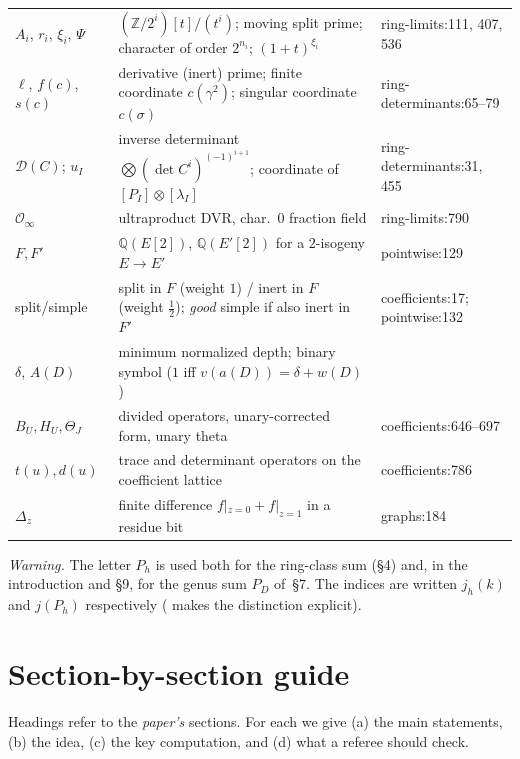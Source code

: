 \documentclass[11pt]{article}
\theoremstyle{remark}
\newcommand{\Q}{\mathbb Q}
\newcommand{\Z}{\mathbb Z}
\newcommand{\cO}{\mathcal O}
\newcommand{\cD}{\mathcal D}
\newcommand{\src}[2]{\textsf{\small #1:#2}}
\begin{document}
{\begin{longtable}{@{}P{0.19\textwidth}P{0.55\textwidth}P{0.2\textwidth}@{}}
$A_i$, $r_i$, $\xi_i$, $\Psi$ & $(\Z/2^i)[t]/(t^i)$; moving split prime; character of order $2^{n_i}$; $(1+t)^{\xi_i}$ & \src{ring-limits}{111, 407, 536} \\
$\ell$, $f(c)$, $s(c)$ & derivative (inert) prime; finite coordinate $c(\gamma^2)$; singular coordinate $c(\sigma)$ & \src{ring-determinants}{65--79} \\
$\cD(C)$; $u_I$ & inverse determinant $\bigotimes(\det C^i)^{(-1)^{i+1}}$; coordinate of $[P_I]\otimes[\lambda_I]$ & \src{ring-determinants}{31, 455} \\
$\cO_\infty$ & ultraproduct DVR, char.\ $0$ fraction field & \src{ring-limits}{790} \\
$F,F'$ & $\Q(E[2])$, $\Q(E'[2])$ for a $2$-isogeny $E\to E'$ & \src{pointwise}{129} \\
split/simple & split in $F$ (weight $1$) / inert in $F$ (weight $\frac12$); \emph{good} simple if also inert in $F'$ & \src{coefficients}{17}; \src{pointwise}{132} \\
$\delta$, $A(D)$ & minimum normalized depth; binary symbol ($1$ iff $v(a(D))=\delta+w(D)$) &  \\
$B_U,H_U,\Theta_J$ & divided operators, unary-corrected form, unary theta & \src{coefficients}{646--697} \\
$t(u),d(u)$ & trace and determinant operators on the coefficient lattice & \src{coefficients}{786} \\
$\Delta_z$ & finite difference $f|_{z=0}+f|_{z=1}$ in a residue bit & \src{graphs}{184} \\
\bottomrule
\end{longtable}}

\noindent\emph{Warning.} The letter $P_h$ is used both for the ring-class sum
(\S4) and, in the introduction and \S9, for the genus sum $P_D$ of~\S7. The
indices are written $j_h(k)$ and $j(P_h)$ respectively
( makes the distinction explicit).

\section{Section-by-section guide}
\label{sec:walk}

Headings refer to the \emph{paper's} sections. For each we give (a) the
main statements, (b) the idea, (c) the key computation, and (d) what a
referee should check.
\end{document}

